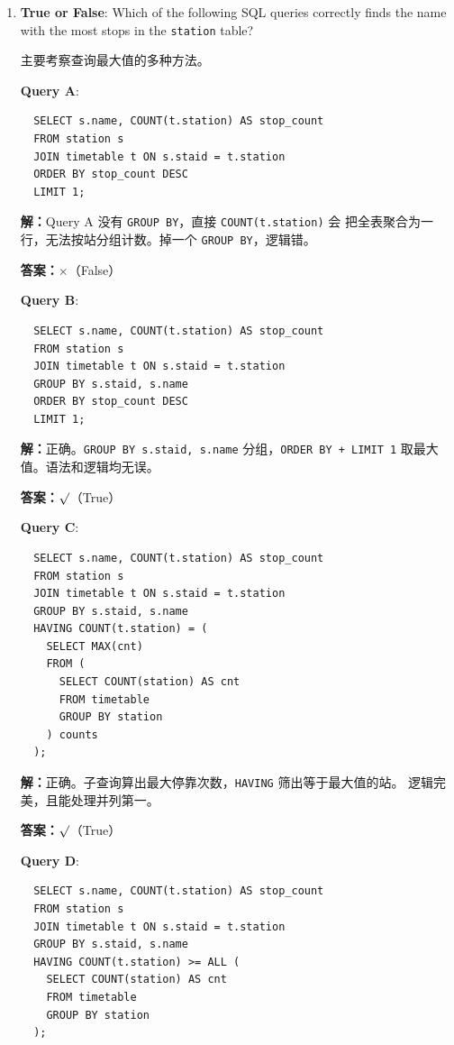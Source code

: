 \documentclass[11pt,a4paper]{article}
\newcommand{\solution}{\par\noindent\textcolor{ansblue}{\textbf{解：}}}
\newcommand{\answer}{\par\noindent\textcolor{ansred}{\textbf{答案：}}}
\begin{document}
\begin{enumerate}[leftmargin=*,itemsep=6pt]

\item \textbf{True or False}: Which of the following SQL queries correctly finds
  the name with the most stops in the \texttt{station} table?

  主要考察查询最大值的多种方法。

  \textbf{Query A}:
  \begin{verbatim}
  SELECT s.name, COUNT(t.station) AS stop_count
  FROM station s
  JOIN timetable t ON s.staid = t.station
  ORDER BY stop_count DESC
  LIMIT 1;
  \end{verbatim}

  \solution Query A 没有 \texttt{GROUP BY}，直接 \texttt{COUNT(t.station)} 会
  把全表聚合为一行，无法按站分组计数。掉一个 \texttt{GROUP BY}，逻辑错。

  \answer \textcolor{ansred}{$\times$（False）}

  \textbf{Query B}:
  \begin{verbatim}
  SELECT s.name, COUNT(t.station) AS stop_count
  FROM station s
  JOIN timetable t ON s.staid = t.station
  GROUP BY s.staid, s.name
  ORDER BY stop_count DESC
  LIMIT 1;
  \end{verbatim}

  \solution 正确。\texttt{GROUP BY s.staid, s.name} 分组，\texttt{ORDER BY + LIMIT 1}
  取最大值。语法和逻辑均无误。

  \answer \textcolor{ansred}{$\surd$（True）}

  \textbf{Query C}:
  \begin{verbatim}
  SELECT s.name, COUNT(t.station) AS stop_count
  FROM station s
  JOIN timetable t ON s.staid = t.station
  GROUP BY s.staid, s.name
  HAVING COUNT(t.station) = (
    SELECT MAX(cnt)
    FROM (
      SELECT COUNT(station) AS cnt
      FROM timetable
      GROUP BY station
    ) counts
  );
  \end{verbatim}

  \solution 正确。子查询算出最大停靠次数，\texttt{HAVING} 筛出等于最大值的站。
  逻辑完美，且能处理并列第一。

  \answer \textcolor{ansred}{$\surd$（True）}

  \textbf{Query D}:
  \begin{verbatim}
  SELECT s.name, COUNT(t.station) AS stop_count
  FROM station s
  JOIN timetable t ON s.staid = t.station
  GROUP BY s.staid, s.name
  HAVING COUNT(t.station) >= ALL (
    SELECT COUNT(station) AS cnt
    FROM timetable
    GROUP BY station
  );
  \end{verbatim}


\end{enumerate}
\end{document}
